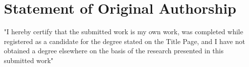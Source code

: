 \chapter{Statement of Original Authorship}

\vspace{4cm}

"I hereby certify that the submitted work is my own work, was completed while registered as a candidate for the degree stated on the Title Page, and I have not obtained a degree elsewhere on the basis of the research presented in this submitted work"